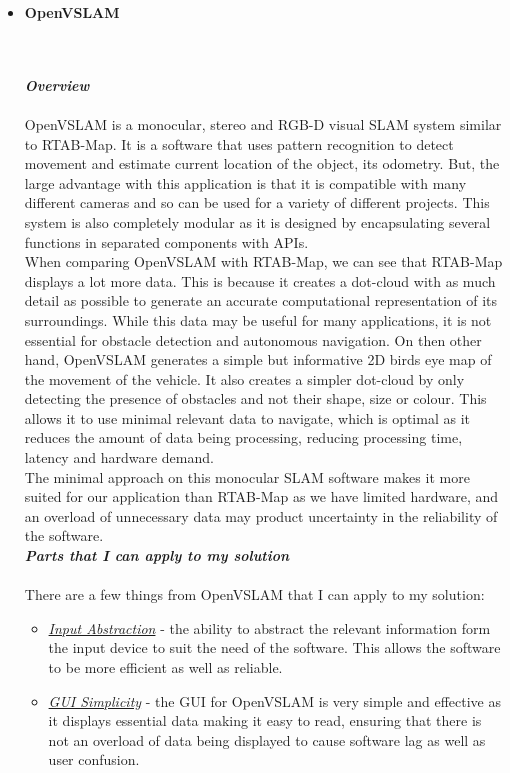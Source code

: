 \documentclass[11pt]{report}
\begin{document}
\begin{itemize}
			\item{\textbf{OpenVSLAM}}
			\\\\
				\begin{frame}{}
				\end{frame}
			\\
			\emph{\textbf{Overview}}
			\\\\
			OpenVSLAM is a monocular, stereo and RGB-D visual SLAM system similar to RTAB-Map. It is a software that uses pattern recognition to detect movement and estimate current location of the object, its odometry. But, the  large advantage with this application is that it is compatible with many different cameras and so can be used for a variety of different projects. This system is also completely modular as it is designed by encapsulating several functions in separated components with APIs. \\
	
			When comparing OpenVSLAM with RTAB-Map, we can see that RTAB-Map displays a lot more data. This is because it creates a dot-cloud with as much detail as possible to generate an accurate computational representation of its surroundings. While this data may be useful for many applications, it is not essential for obstacle detection and autonomous navigation. On then other hand, OpenVSLAM generates a simple but informative 2D birds eye map of the movement of the vehicle. It also creates a simpler dot-cloud by only detecting the presence of obstacles and not their shape, size or colour. This allows it to use minimal relevant data to navigate, which is optimal as it reduces the amount of data being processing, reducing processing time, latency and hardware demand. \\
	
			The minimal approach on this monocular SLAM software makes it more suited for our application than RTAB-Map as we have limited hardware, and an overload of unnecessary data may product uncertainty in the reliability of the software. \\
			\newpage
			\emph{\textbf{Parts that I can apply to my solution}}
			\\\\There are a few things from OpenVSLAM that I can apply to my solution:
				\begin{itemize}
					\item{\underline{\emph{Input Abstraction}}} - the ability to abstract the relevant information form the 		input device to suit the need of the software. This allows the software to be more efficient as well as 		reliable.
					\item{\underline{\emph{GUI Simplicity}}} - the GUI for OpenVSLAM is very simple and effective as it 		displays essential data making it easy to read, ensuring that there is not an overload of data being 			displayed to cause software lag as well as user confusion. 
				\end{itemize}
	
	
		\end{itemize}
		\newpage
\end{document}

